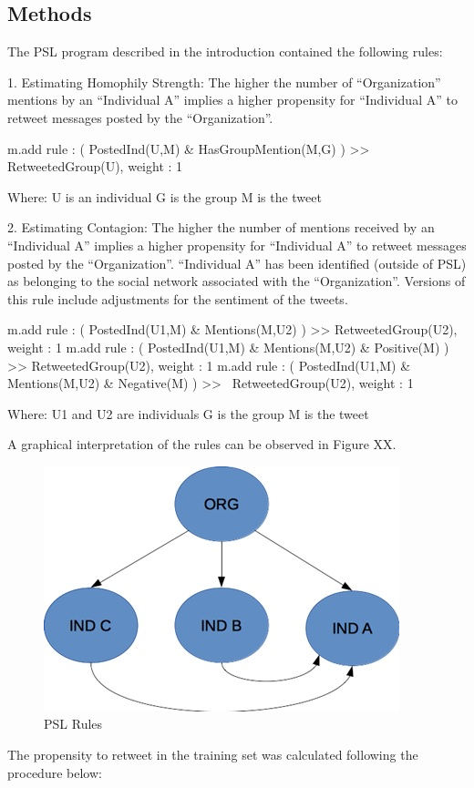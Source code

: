 \subsection{Methods}
The PSL program described in the introduction contained the following rules:

1. Estimating Homophily Strength: The higher the number of “Organization” mentions by an “Individual A” implies a higher propensity for “Individual A” to retweet messages posted by the “Organization”. 

m.add rule : ( PostedInd(U,M) \& HasGroupMention(M,G) ) >> RetweetedGroup(U),  weight : 1

Where:
U is an individual
G is the group
M is the tweet

2. Estimating Contagion: The higher the number of mentions received by an “Individual A” implies a higher propensity for “Individual A” to retweet messages posted by the “Organization”.  “Individual A” has been identified (outside of PSL) as belonging to the social network associated with the “Organization”.  Versions of this rule include adjustments for the sentiment of the tweets.

m.add rule : ( PostedInd(U1,M) \& Mentions(M,U2) ) >> RetweetedGroup(U2),  weight : 1
m.add rule : ( PostedInd(U1,M) \& Mentions(M,U2) \& Positive(M) ) >> RetweetedGroup(U2),  weight : 1
m.add rule : ( PostedInd(U1,M) \& Mentions(M,U2) \& Negative(M) ) >> ~RetweetedGroup(U2),  weight : 1

Where:
U1 and U2 are individuals
G is the group
M is the tweet

A graphical interpretation of the rules can be observed in Figure XX.  
\begin{figure}
\includegraphics[scale=0.5]{PSL_model}
\caption{PSL Rules}
\end{figure}

The propensity to retweet in the training set was calculated following the procedure below:

